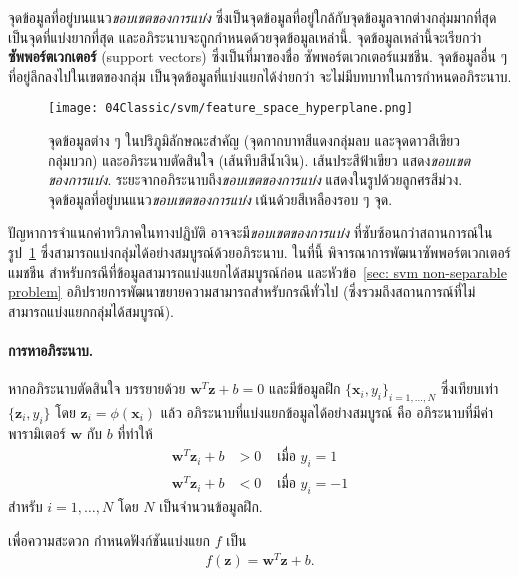 จุดข้อมูลที่อยู่บนแนว\textit{ขอบเขตของการแบ่ง}
ซึ่งเป็นจุดข้อมูลที่อยู่ใกล้กับจุดข้อมูลจากต่างกลุ่มมากที่สุด
เป็นจุดที่แบ่งยากที่สุด
และอภิระนาบจะถูกกำหนดด้วยจุดข้อมูลเหล่านี้.
จุดข้อมูลเหล่านี้จะเรียกว่า \textbf{ซัพพอร์ตเวกเตอร์} (support vectors)
ซึ่งเป็นที่มาของชื่อ ซัพพอร์ตเวกเตอร์แมชชีน.
จุดข้อมูลอื่น ๆ ที่อยู่ลึกลงไปในเขตของกลุ่ม เป็นจุดข้อมูลที่แบ่งแยกได้ง่ายกว่า จะไม่มีบทบาทในการกำหนดอภิระนาบ.

\begin{figure}
\begin{center}
\texttt{[image: 04Classic/svm/feature\_space\_hyperplane.png]}
\end{center}
	\caption[ช่องว่างของการแบ่งกลุ่ม]{จุดข้อมูลต่าง ๆ ในปริภูมิลักษณะสำคัญ (จุดกากบาทสีแดงกลุ่มลบ และจุดดาวสีเขียวกลุ่มบวก) และอภิระนาบตัดสินใจ (เส้นทึบสีน้ำเงิน).
	เส้นประสีฟ้าเขียว แสดง\textit{ขอบเขตของการแบ่ง}. 
	ระยะจากอภิระนาบถึง\textit{ขอบเขตของการแบ่ง} แสดงในรูปด้วยลูกศรสีม่วง. 
	จุดข้อมูลที่อยู่บนแนว\textit{ขอบเขตของการแบ่ง} เน้นด้วยสีเหลืองรอบ ๆ จุด.
	}
	\label{fig: margin of separation}
\end{figure}

ปัญหาการจำแนกค่าทวิภาคในทางปฏิบัติ 
อาจจะมี\textit{ขอบเขตของการแบ่ง} ที่ซับซ้อนกว่าสถานการณ์ในรูป~\ref{fig: margin of separation}
ซึ่งสามารถแบ่งกลุ่มได้อย่างสมบูรณ์ด้วยอภิระนาบ.
ในที่นี้ พิจารณาการพัฒนาซัพพอร์ตเวกเตอร์แมชชีน สำหรับกรณีที่ข้อมูลสามารถแบ่งแยกได้สมบูรณ์ก่อน
และหัวข้อ~\ref{sec: svm non-separable problem} อภิปรายการพัฒนาขยายความสามารถสำหรับกรณีทั่วไป 
(ซึ่งรวมถึงสถานการณ์ที่ไม่สามารถแบ่งแยกกลุ่มได้สมบูรณ์).

\paragraph{การหาอภิระนาบ.}
หากอภิระนาบตัดสินใจ บรรยายด้วย $\bm{w}^T \bm{z} + b = 0$
และมีข้อมูลฝึก $\{\bm{x}_i, y_i\}_{i=1, \ldots, N}$ 
ซึ่งเทียบเท่า $\{\bm{z}_i, y_i\}$ โดย $\bm{z}_i = \phi(\bm{x}_i)$
แล้ว 
อภิระนาบที่แบ่งแยกข้อมูลได้อย่างสมบูรณ์ คือ
อภิระนาบที่มีค่าพารามิเตอร์ $\bm{w}$ กับ $b$ ที่ทำให้
\begin{eqnarray}
\bm{w}^T \bm{z}_i + b &> 0 & \mbox{ เมื่อ } y_i = 1
\nonumber \\
\bm{w}^T \bm{z}_i + b &< 0 & \mbox{ เมื่อ } y_i = -1
\label{eq: svm separable starting criteria}
\end{eqnarray}
สำหรับ $i = 1, \ldots, N$ โดย $N$ เป็นจำนวนข้อมูลฝึก.

เพื่อความสะดวก
กำหนดฟังก์ชันแบ่งแยก $f$ เป็น
\begin{eqnarray}
f(\bm{z}) = \bm{w}^T \bm{z} + b
\label{eq: svm discriminant function}.
\end{eqnarray}

